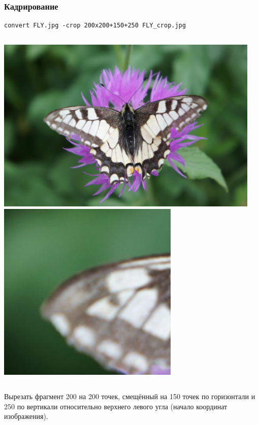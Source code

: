 \documentclass[11pt, compress]{beamer}
\begin{document}
\begin{frame}[c, fragile]
\frametitle{Кадрирование}
\begin{lstlisting}
convert FLY.jpg -crop 200x200+150+250 FLY_crop.jpg
\end{lstlisting}
\begin{columns}
\center
\includegraphics[width=0.95\textwidth]{FLY1000.jpg}
\center
\includegraphics[width=0.65\textwidth]{FLY_crop.jpg}
\end{columns}
Вырезать фрагмент 200 на 200 точек, смещённый на 150 точек по горизонтали и 250 по вертикали относительно верхнего левого угла (начало координат изображения). 
\end{frame}
\end{document}
